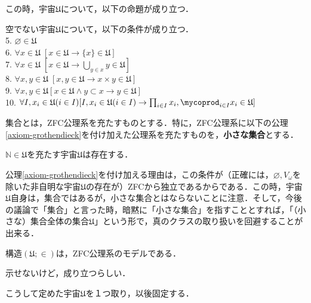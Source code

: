 \documentclass[uplatex, 12pt, dvipdfmx]{jsreport}
\let\coprod\mycoprod
\begin{document}
この時，宇宙$\mathfrak{U}$について，以下の命題が成り立つ．
\begin{shadebox}\begin{proposition}\rm{}空でない宇宙$\mathfrak{U}$について，以下の条件が成り立つ．\\
    5. $\varnothing\in\mathfrak{U}$\\
    6. $\forall x\in\mathfrak{U} \; [x\in\mathfrak{U}\rightarrow \{ x \} \in \mathfrak{U}]$\\
    7. $\forall x\in\mathfrak{U} \; [x\in\mathfrak{U}\rightarrow \bigcup_{y\in x}y\in\mathfrak{U}]$\\
    8. $\forall x,y\in\mathfrak{U} \; [x,y \in\mathfrak{U}\rightarrow x\times y\in\mathfrak{U}]$\\
    9. $\forall x,y\in\mathfrak{U} [x\in\mathfrak{U} \wedge y\subset x \rightarrow y\in\mathfrak{U}]$\\
    10. $\forall I,x_i\in\mathfrak{U}(i\in I) [I,x_i\in\mathfrak{U}(i\in I)\rightarrow \prod_{i\in I}x_i , \coprod_{i\in I}x_i\in\mathfrak{U}]$
\end{proposition}\end{shadebox}

\begin{shadebox}\begin{definition}[（小さな）集合]\rm{}集合とは，ZFC公理系を充たすものとする．特に，ZFC公理系に以下の公理\ref{axiom-grothendieck}を付け加えた公理系を充たすものを，\textbf{小さな集合}とする．
\begin{axiom}[Grothendieck宇宙の存在]\label{axiom-grothendieck}$\mathbb{N}\in\mathfrak{U}$を充たす宇宙$\mathfrak{U}$は存在する．\end{axiom}
\end{definition}\end{shadebox}
公理\ref{axiom-grothendieck}を付け加える理由は，この条件が（正確には，$\varnothing,V_\omega$を除いた非自明な宇宙$\mathfrak{U}$の存在が）ZFCから独立であるからである．この時，宇宙$\mathfrak{U}$自身は，集合ではあるが，小さな集合とはならないことに注意．そして，今後の議論で「集合」と言った時，暗黙に「小さな集合」を指すこととすれば，「（小さな）集合全体の集合$\mathfrak{U}$」という形で，真のクラスの取り扱いを回避することが出来る．
\begin{proposition}\rm{}
    構造$(\mathfrak{U};\in)$は，ZFC公理系のモデルである．
\end{proposition}
示せないけど，成り立つらしい．

こうして定めた宇宙$\mathfrak{U}$を１つ取り，以後固定する．
\end{document}
